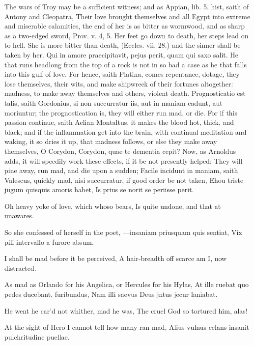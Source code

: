 {The wars of Troy may be a sufficient witness; and as Appian, lib. 5.
hist, saith of Antony and Cleopatra, Their love brought
themselves and all Egypt into extreme and miserable calamities, the end
of her is as bitter as wormwood, and as sharp as a two-edged sword,
Prov. v. 4, 5. Her feet go down to death, her steps lead on to hell.
She is more bitter than death, (Eccles. vii. 28.) and the sinner shall
be taken by her. Qui in amore praecipitavit, pejus perit, quam
qui saxo salit. He that runs headlong from the top of a rock is
not in so bad a case as he that falls into this gulf of love. For
hence, saith  Platina, comes repentance, dotage, they lose
themselves, their wits, and make shipwreck of their fortunes
altogether: madness, to make away themselves and others, violent death.
Prognosticatio est talis, saith Gordonius, si non succurratur
iis, aut in maniam cadunt, aut moriuntur; the prognostication is, they
will either run mad, or die. For if this passion continue, saith
Aelian Montaltus, it makes the blood hot, thick, and black; and
if the inflammation get into the brain, with continual meditation and
waking, it so dries it up, that madness follows, or else they make away
themselves, O Corydon, Corydon, quae te dementia cepit? Now, as
Arnoldus adds, it will speedily work these effects, if it be not
presently helped; They will pine away, run mad, and die upon a
sudden; Facile incidunt in maniam, saith Valescus, quickly mad, nisi
succurratur, if good order be not taken,
Ehou triste jugum quisquis amoris habet,
Is prius se norit se periisse perit.

Oh heavy yoke of love, which whoso bears,
Is quite undone, and that at unawares.

So she confessed of herself in the poet,
---insaniam priusquam quis sentiat,
Vix pili intervallo a furore absum.

I shall be mad before it be perceived,
A hair-breadth off scarce am I, now distracted.

As mad as Orlando for his Angelica, or Hercules for his Hylas,
At ille ruebat quo pedes ducebant, furibundus,
Nam illi saevus Deus jntus jecur laniabat.

He went he car'd not whither, mad he was,
The cruel God so tortured him, alas!

At the sight of Hero I cannot tell how many ran mad,
Alius vulnus celans insanit pulchritudine puellae.

}
